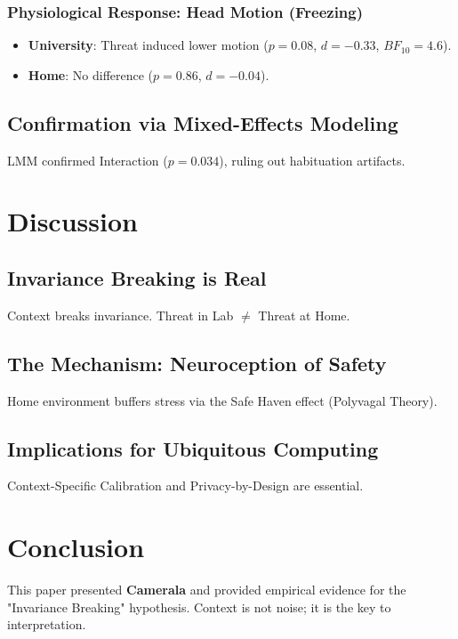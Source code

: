 \documentclass[journal]{IEEEtran}
\begin{document}
\subsubsection{Physiological Response: Head Motion (Freezing)}
\begin{itemize}
    \item \textbf{University}: Threat induced lower motion ($p = 0.08$, $d = -0.33$, $BF_{10} = 4.6$).
    \item \textbf{Home}: No difference ($p = 0.86$, $d = -0.04$).
\end{itemize}

\subsection{Confirmation via Mixed-Effects Modeling}
LMM confirmed Interaction ($p = 0.034$), ruling out habituation artifacts.

\section{Discussion}
\subsection{Invariance Breaking is Real}
Context breaks invariance. Threat in Lab $\neq$ Threat at Home.
\subsection{The Mechanism: Neuroception of Safety}
Home environment buffers stress via the Safe Haven effect (Polyvagal Theory).
\subsection{Implications for Ubiquitous Computing}
Context-Specific Calibration and Privacy-by-Design are essential.

\section{Conclusion}
This paper presented \textbf{Camerala} and provided empirical evidence for the "Invariance Breaking" hypothesis. Context is not noise; it is the key to interpretation.



\end{document}
